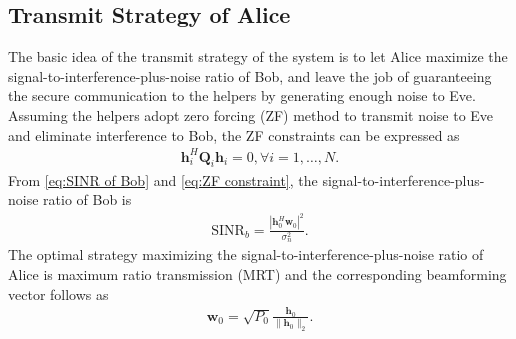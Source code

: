 \documentclass[journal]{IEEEtran}
\begin{document}
\subsection{Transmit Strategy of Alice}
The basic idea of the transmit strategy of the system is to let Alice maximize the signal-to-interference-plus-noise ratio of Bob, and leave the job of guaranteeing the secure communication to the helpers by generating enough noise to Eve. Assuming the helpers adopt zero forcing (ZF) method to transmit noise to Eve and eliminate interference to Bob,
the ZF constraints can be expressed as
\begin{eqnarray} \label{eq:ZF constraint}
\mathbf{h}_i^H\mathbf{Q}_i \mathbf{h}_i = 0, \forall i = 1,\ldots,N \label{eq:ZF_constraint_relaxed}.
\end{eqnarray}
From \eqref{eq:SINR of Bob} and \eqref{eq:ZF constraint}, the signal-to-interference-plus-noise ratio of Bob is 
\begin{eqnarray}
\mathrm{SINR}_b= \frac{\left| \mathbf{h}_{0}^H\mathbf{w}_{0}\right|^2}{\sigma_n^2 }. 
\end{eqnarray}
The optimal strategy maximizing the signal-to-interference-plus-noise ratio of Alice is maximum ratio transmission (MRT) and the corresponding beamforming vector follows as
\begin{eqnarray}
\mathbf{w}_0 = \sqrt{P_0}\frac{\mathbf{h}_0}{\|\mathbf{h}_0\|_2} \label{eq:optimal_w}.
\end{eqnarray}
\end{document}
